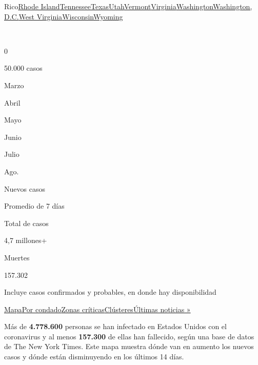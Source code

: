 {Rico}\href{https://www.nytimes3xbfgragh.onion/interactive/2020/us/rhode-island-coronavirus-cases.html}{Rhode
Island}\href{https://www.nytimes3xbfgragh.onion/interactive/2020/us/tennessee-coronavirus-cases.html}{Tennessee}\href{https://www.nytimes3xbfgragh.onion/interactive/2020/us/texas-coronavirus-cases.html}{Texas}\href{https://www.nytimes3xbfgragh.onion/interactive/2020/us/utah-coronavirus-cases.html}{Utah}\href{https://www.nytimes3xbfgragh.onion/interactive/2020/us/vermont-coronavirus-cases.html}{Vermont}\href{https://www.nytimes3xbfgragh.onion/interactive/2020/us/virginia-coronavirus-cases.html}{Virginia}\href{https://www.nytimes3xbfgragh.onion/interactive/2020/us/washington-coronavirus-cases.html}{Washington}\href{https://www.nytimes3xbfgragh.onion/interactive/2020/us/washington-dc-coronavirus-cases.html}{Washington,
D.C.}\href{https://www.nytimes3xbfgragh.onion/interactive/2020/us/west-virginia-coronavirus-cases.html}{West
Virginia}\href{https://www.nytimes3xbfgragh.onion/interactive/2020/us/wisconsin-coronavirus-cases.html}{Wisconsin}\href{https://www.nytimes3xbfgragh.onion/interactive/2020/us/wyoming-coronavirus-cases.html}{Wyoming}

~

0

50.000 casos

Marzo

Abril

Mayo

Junio

Julio

Ago.

Nuevos casos

Promedio de 7 días

Total de casos

4,7 millones+

Muertes

157.302

Incluye casos confirmados y probables, en donde hay disponibilidad

\protect\hyperlink{map}{Mapa}\protect\hyperlink{states}{Por
condado}\protect\hyperlink{hotspots}{Zonas
críticas}\protect\hyperlink{clusters}{Clústeres}\href{https://www.nytimes3xbfgragh.onion/2020/08/04/world/coronavirus-covid-19.html}{Últimas
noticias »}

Más de \textbf{4.778.600} personas se han infectado en Estados Unidos
con el coronavirus y al menos \textbf{157.300} de ellas han fallecido,
según una base de datos de The New York Times. Este mapa muestra dónde
van en aumento los nuevos casos y dónde están disminuyendo en los
últimos 14 días.

